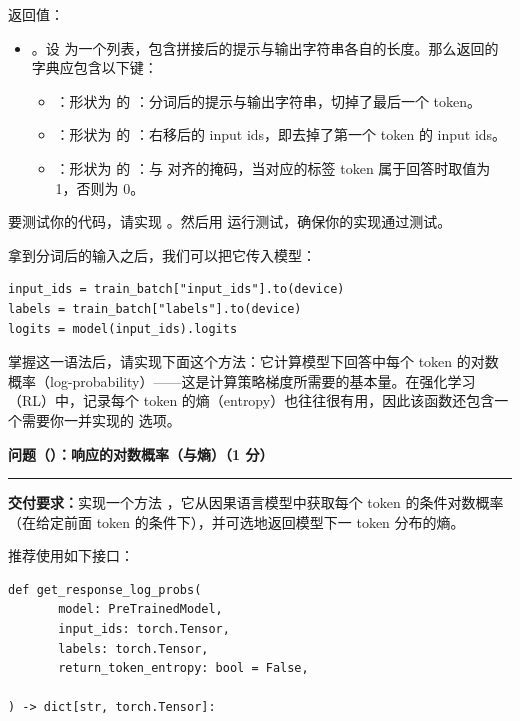 返回值：

\begin{itemize}
  \item {}。设  为一个列表，包含拼接后的提示与输出字符串各自的长度。那么返回的字典应包含以下键：
  \begin{itemize}
    \item {}：形状为  的 ：分词后的提示与输出字符串，切掉了最后一个 token。
    \item {}：形状为  的 ：右移后的 input ids，即去掉了第一个 token 的 input ids。
    \item {}：形状为  的 ：与  对齐的掩码，当对应的标签 token 属于回答时取值为 1，否则为 0。
  \end{itemize}
\end{itemize}

要测试你的代码，请实现 。然后用  运行测试，确保你的实现通过测试。

拿到分词后的输入之后，我们可以把它传入模型：

\begin{lstlisting}
input_ids = train_batch["input_ids"].to(device)
labels = train_batch["labels"].to(device)
logits = model(input_ids).logits
\end{lstlisting}

掌握这一语法后，请实现下面这个方法：它计算模型下回答中每个 token 的对数概率（log-probability）——这是计算策略梯度所需要的基本量。在强化学习（RL）中，记录每个 token 的熵（entropy）也往往很有用，因此该函数还包含一个需要你一并实现的  选项。

\medskip
\noindent\textbf{问题（）：响应的对数概率（与熵）（1 分）}
\par\nobreak\smallskip\hrule\nobreak\medskip

\textbf{交付要求：}实现一个方法 ，它从因果语言模型中获取每个 token 的条件对数概率（在给定前面 token 的条件下），并可选地返回模型下一 token 分布的熵。

推荐使用如下接口：

\begin{lstlisting}
def get_response_log_probs(
       model: PreTrainedModel,
       input_ids: torch.Tensor,
       labels: torch.Tensor,
       return_token_entropy: bool = False,

) -> dict[str, torch.Tensor]:
\end{lstlisting}


